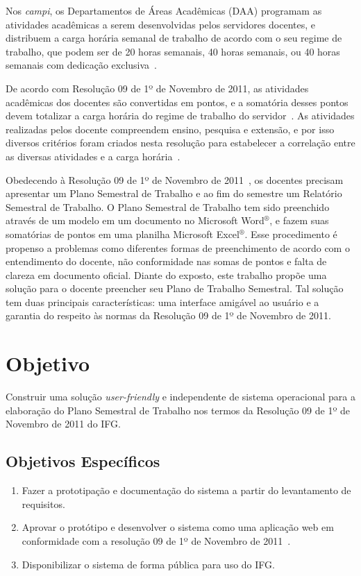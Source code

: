 Nos \textit{campi}, os Departamentos de Áreas Acadêmicas (DAA) programam as atividades acadêmicas a serem desenvolvidas pelos servidores docentes, e distribuem a carga horária semanal de trabalho de acordo com o seu regime de trabalho, que podem ser de 20 horas semanais, 40 horas semanais, ou 40 horas semanais com dedicação exclusiva~\citep{resolucao}.

De acordo com Resolução 09 de 1º de Novembro de 2011, as atividades acadêmicas dos docentes são convertidas em pontos, e a somatória desses pontos devem totalizar a carga horária do regime de trabalho do servidor~\citep{resolucao}.
As atividades realizadas pelos docente compreendem ensino, pesquisa e extensão, e por isso diversos critérios foram criados nesta resolução para estabelecer a correlação entre as diversas atividades e a carga horária~\citep{resolucao}.

Obedecendo à Resolução 09 de 1º de Novembro de 2011~\citep{resolucao}, os docentes precisam apresentar um Plano Semestral de Trabalho e ao fim do semestre um Relatório Semestral de Trabalho.
O Plano Semestral de Trabalho tem sido preenchido através de um modelo em um documento no Microsoft Word$^{\circledR}$, e fazem suas somatórias de pontos em uma planilha Microsoft Excel$^{\circledR}$. 
Esse procedimento é propenso a problemas como diferentes formas de preenchimento de acordo com o entendimento do docente, não conformidade nas somas de pontos e falta de clareza em documento oficial.
Diante do exposto, este trabalho propõe uma solução para o docente preencher seu Plano de Trabalho Semestral. 
Tal solução tem duas principais características: uma interface amigável ao usuário e a garantia do respeito às normas da Resolução 09 de 1º de Novembro de 2011.

\section{Objetivo}
\indent

Construir uma solução \textit{user-friendly} e independente de sistema operacional para a elaboração do Plano Semestral de Trabalho nos termos da Resolução 09 de 1º de Novembro de 2011 do IFG.

\subsection*{Objetivos Específicos}

\begin{enumerate}
	\item Fazer a prototipação e documentação do sistema a partir do levantamento de requisitos.
	\item Aprovar o protótipo e desenvolver o sistema como uma aplicação web em conformidade com a resolução 09 de 1º de Novembro de 2011~\citep{resolucao}.
	\item Disponibilizar o sistema de forma pública para uso do IFG.
\end{enumerate}



